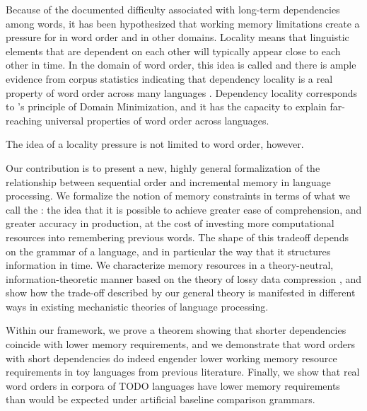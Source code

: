 Because of the documented difficulty associated with long-term dependencies among words, it has been hypothesized that working memory limitations create a pressure for  in word order and in other domains. Locality means that linguistic elements that are dependent on each other will typically appear close to each other in time. In the domain of word order, this idea is called  and there is ample evidence from corpus statistics indicating that dependency locality is a real property of word order across many languages \citep[for recent reviews of this idea and the evidence for it, see][]{liu-dependency-2017,temperley-minimizing-2018}. Dependency locality corresponds to \citet{hawkins2004efficiency}'s principle of Domain Minimization, and it has the capacity to explain far-reaching universal properties of word order across languages. 

The idea of a locality pressure is not limited to word order, however. %

Our contribution is to present a new, highly general formalization of the relationship between sequential order and incremental memory in language processing. We formalize the notion of memory constraints in terms of what we call the : the idea that it is possible to achieve greater ease of comprehension, and greater accuracy in production, at the cost of investing more computational resources into remembering previous words.
The shape of this tradeoff depends on the grammar of a language, and in particular the way that it structures information in time.
We characterize memory resources in a theory-neutral, information-theoretic manner based on the theory of lossy data compression \citep{cover2006elements,berger}, and show how the trade-off described by our general theory is manifested in different ways in existing mechanistic theories of language processing. %

Within our framework, we prove a theorem showing that shorter dependencies coincide with lower memory requirements, and we demonstrate that word orders with short dependencies do indeed engender lower working memory resource requirements in toy languages from previous literature. Finally, we show that real word orders in corpora of TODO languages have lower memory requirements than would be expected under artificial baseline comparison grammars. 

